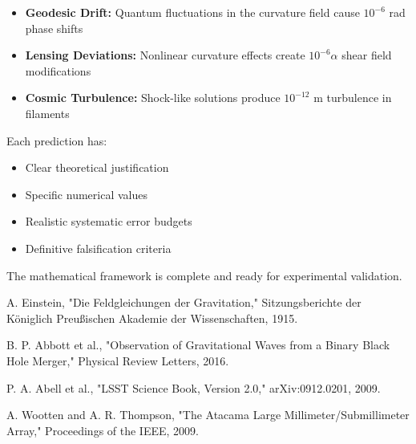 \documentclass[11pt]{article}
\begin{document}
\begin{itemize}
\item \textbf{Geodesic Drift:} Quantum fluctuations in the curvature field cause $10^{-6}$ rad phase shifts
\item \textbf{Lensing Deviations:} Nonlinear curvature effects create $10^{-6}\alpha$ shear field modifications
\item \textbf{Cosmic Turbulence:} Shock-like solutions produce $10^{-12}$ m turbulence in filaments
\end{itemize}

Each prediction has:
\begin{itemize}
\item Clear theoretical justification
\item Specific numerical values
\item Realistic systematic error budgets
\item Definitive falsification criteria
\end{itemize}

The mathematical framework is complete and ready for experimental validation.

\begin{thebibliography}{99}

A. Einstein, "Die Feldgleichungen der Gravitation," Sitzungsberichte der Königlich Preußischen Akademie der Wissenschaften, 1915.

B. P. Abbott et al., "Observation of Gravitational Waves from a Binary Black Hole Merger," Physical Review Letters, 2016.

P. A. Abell et al., "LSST Science Book, Version 2.0," arXiv:0912.0201, 2009.

A. Wootten and A. R. Thompson, "The Atacama Large Millimeter/Submillimeter Array," Proceedings of the IEEE, 2009.

\end{thebibliography}

\end{document}

